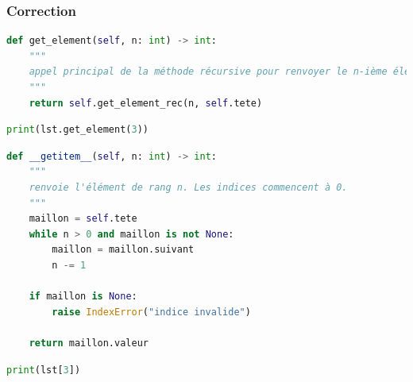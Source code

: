 \documentclass[svgnames,11pt]{beamer}
\begin{document}
\begin{frame}[fragile]
    \frametitle{Correction}

    \begin{center}
    \begin{lstlisting}[language=Python , basicstyle=\ttfamily\small, xleftmargin=1em, xrightmargin=1em]
def get_element(self, n: int) -> int:
    """
    appel principal de la méthode récursive pour renvoyer le n-ième élément
    """
    return self.get_element_rec(n, self.tete)
\end{lstlisting}
    \end{center}
    \begin{center}
        \begin{lstlisting}[language=Python , basicstyle=\ttfamily\small, xleftmargin=2em, xrightmargin=2em]
print(lst.get_element(3))
\end{lstlisting}
        \label{CODE}
    \end{center}
\end{frame}
\begin{frame}[fragile]
    \begin{center}
    \begin{lstlisting}[language=Python , basicstyle=\ttfamily\small, xleftmargin=2em, xrightmargin=2em]
def __getitem__(self, n: int) -> int:
    """
    renvoie l'élément de rang n. Les indices commencent à 0.
    """
    maillon = self.tete
    while n > 0 and maillon is not None:
        maillon = maillon.suivant
        n -= 1

    if maillon is None:
        raise IndexError("indice invalide")

    return maillon.valeur
\end{lstlisting}
    \end{center}
    \begin{center}
        \begin{lstlisting}[language=Python , basicstyle=\ttfamily\small, xleftmargin=2em, xrightmargin=2em]
print(lst[3])
\end{lstlisting}
        \label{CODE}
    \end{center}
\end{frame}
\end{document}
